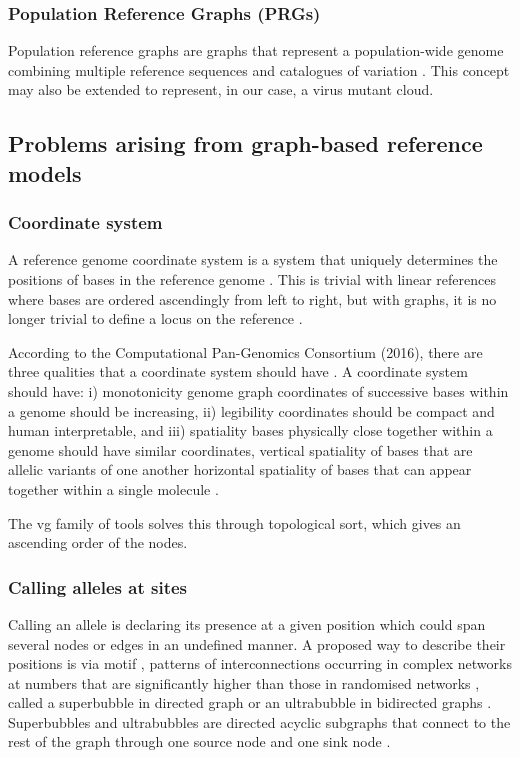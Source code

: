 \documentclass[10pt, a4paper]{article}
\begin{document}
\subsubsection{Population Reference Graphs (PRGs)}
\label{sec:org113cb22}
Population reference graphs are graphs that represent a population-wide genome
combining multiple reference sequences and catalogues of variation
\cite{diltheyImprovedGenomeInference2015,liDesignConstructionReference2020}. 
This concept may also be extended to represent, in our case, a virus mutant
cloud.

\subsection{Problems arising from graph-based reference models}
\label{sec:orgee80533}
\subsubsection{Coordinate system}
\label{sec:org27e413e}
A reference genome coordinate system is a system that uniquely determines the
positions of bases in the reference genome 
\cite{randCoordinatesIntervalsGraphbased2017}. 
This is trivial with linear references where bases are ordered ascendingly from 
left to right, but with graphs, it is no longer trivial to define a locus on 
the reference \cite{patenGenomeGraphsEvolution2017}. 

According to the Computational Pan-Genomics Consortium (2016), there are three
qualities that a coordinate system should have 
\cite{patenGenomeGraphsEvolution2017,randCoordinatesIntervalsGraphbased2017}. 
A coordinate system should have: i) monotonicity genome graph coordinates of
successive bases within a genome should be increasing, ii) legibility
coordinates should be compact and human interpretable, and iii) spatiality
bases physically close together within a genome should have similar coordinates,
vertical spatiality of bases that are allelic variants of one another 
\cite{randCoordinatesIntervalsGraphbased2017} horizontal spatiality of bases that can appear together 
within a single molecule \cite{randCoordinatesIntervalsGraphbased2017}. 

The vg family of tools solves this through topological sort, which gives an 
ascending order of the nodes.

\subsubsection{Calling alleles at sites}
\label{sec:orgdbedd57}
Calling an allele is declaring its presence at a given position which could span
several nodes or edges in an undefined manner. 
A proposed way to describe their positions is via motif
\cite{patenGenomeGraphsEvolution2017}, patterns of interconnections occurring in
complex networks at numbers that are significantly higher than those in
randomised networks \cite{miloNetworkMotifsSimple2002}, called a superbubble in directed graph
or an ultrabubble in bidirected graphs \cite{patenGenomeGraphsEvolution2017}.
Superbubbles and ultrabubbles are directed acyclic subgraphs that connect to the
rest of the graph through one source node and one sink node
\cite{patenGenomeGraphsEvolution2017}.
\end{document}
